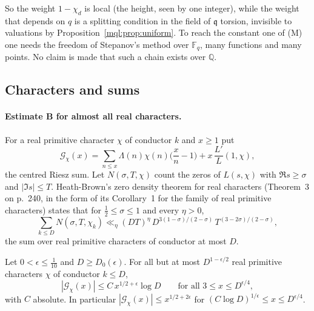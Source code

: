 So the weight $1-\chi_{d}$ is local (the height, seen by one integer), while the weight that depends on $q$ is a splitting condition in the field of $\mathfrak q$ torsion, invisible to valuations by Proposition~\ref{mql:prop:uniform}. To reach the constant one of (M) one needs the freedom of Stepanov's method over $\mathbb F_q$, many functions and many points. No claim is made that such a chain exists over $\mathbb Q$.

\subsection{Characters and sums}\label{mql:sub:characters}

\paragraph{Estimate B for almost all real characters.} For a real primitive character $\chi$ of conductor $k$ and $x\ge1$ put
\[
\mathcal G_\chi(x)=\sum_{n\le x}\Lambda(n)\chi(n)\Big(\frac xn-1\Big)+x\,\frac{L'}{L}(1,\chi),
\]
the centred Riesz sum. Let $N(\sigma,T,\chi)$ count the zeros of $L(s,\chi)$ with $\Re s\ge\sigma$ and $|\Im s|\le T$. Heath-Brown's zero density theorem for real characters \cite{HeathBrown95} (Theorem~3 on p.~240, in the form of its Corollary~1 for the family of real primitive characters) states that for $\frac12\le\sigma\le1$ and every $\eta>0$,
\begin{equation}\label{mql:eq:HB}
\sum_{k\le D}N(\sigma,T,\chi_k)\ll_\eta(DT)^\eta\,D^{3(1-\sigma)/(2-\sigma)}\,T^{(3-2\sigma)/(2-\sigma)},
\end{equation}
the sum over real primitive characters of conductor at most $D$.

\begin{theorem}\label{mql:thm:Balmost}
Let $0<\epsilon\le\frac1{10}$ and $D\ge D_0(\epsilon)$. For all but at most $D^{1-\epsilon/2}$ real primitive characters $\chi$ of conductor $k\le D$,
\[
|\mathcal G_\chi(x)|\le C\,x^{1/2+\epsilon}\log D\qquad\text{for all }3\le x\le D^{\epsilon/4},
\]
with $C$ absolute. In particular $|\mathcal G_\chi(x)|\le x^{1/2+2\epsilon}$ for $(C\log D)^{1/\epsilon}\le x\le D^{\epsilon/4}$.
\end{theorem}


